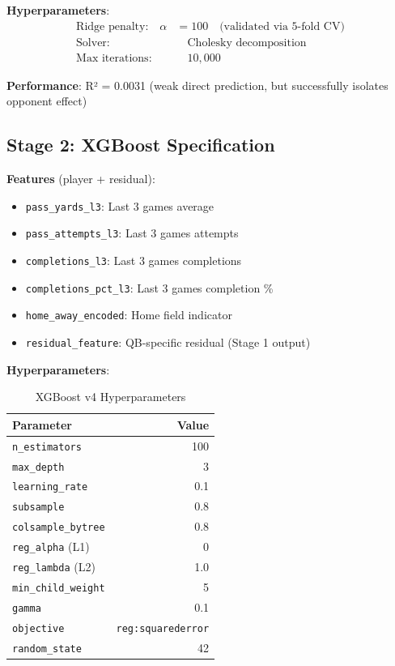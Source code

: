 \textbf{Hyperparameters}:
\begin{align}
\text{Ridge penalty:} \quad \alpha &= 100 \quad \text{(validated via 5-fold CV)} \\
\text{Solver:} & \quad \text{Cholesky decomposition} \\
\text{Max iterations:} & \quad 10{,}000
\end{align}

\textbf{Performance}: R² = 0.0031 (weak direct prediction, but successfully isolates opponent effect)

\subsection{Stage 2: XGBoost Specification}

\textbf{Features} (player + residual):
\begin{itemize}
\item \texttt{pass\_yards\_l3}: Last 3 games average
\item \texttt{pass\_attempts\_l3}: Last 3 games attempts
\item \texttt{completions\_l3}: Last 3 games completions
\item \texttt{completions\_pct\_l3}: Last 3 games completion \%
\item \texttt{home\_away\_encoded}: Home field indicator
\item \texttt{residual\_feature}: QB-specific residual (Stage 1 output)
\end{itemize}

\textbf{Hyperparameters}:
\begin{table}[h]
\centering
\caption{XGBoost v4 Hyperparameters}
\label{tab:xgboost-v4-hyperparameters}
\begin{tabular}{lr}
\toprule
\textbf{Parameter} & \textbf{Value} \\
\midrule
\texttt{n\_estimators} & 100 \\
\texttt{max\_depth} & 3 \\
\texttt{learning\_rate} & 0.1 \\
\texttt{subsample} & 0.8 \\
\texttt{colsample\_bytree} & 0.8 \\
\texttt{reg\_alpha} (L1) & 0 \\
\texttt{reg\_lambda} (L2) & 1.0 \\
\texttt{min\_child\_weight} & 5 \\
\texttt{gamma} & 0.1 \\
\texttt{objective} & \texttt{reg:squarederror} \\
\texttt{random\_state} & 42 \\
\bottomrule
\end{tabular}
\end{table}

